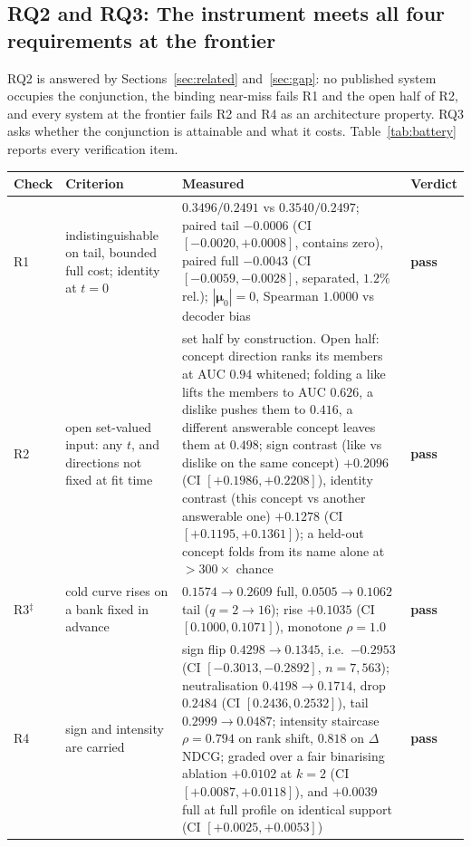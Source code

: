 \documentclass[manuscript,screen]{acmart}
\newcommand{\bmu}{\boldsymbol{\mu}}
\begin{document}
\subsection{RQ2 and RQ3: The instrument meets all four requirements at the frontier}\label{sec:res:battery}

RQ2 is answered by Sections~\ref{sec:related} and~\ref{sec:gap}: no published system occupies the conjunction, the binding near-miss fails R1 and the open half of R2, and every system at the frontier fails R2 and R4 as an architecture property. RQ3 asks whether the conjunction is attainable and what it costs. Table~\ref{tab:battery} reports every verification item.

\begin{table}[t]\centering\small
\setlength{\tabcolsep}{4pt}
\renewcommand{\arraystretch}{1.15}
\begin{tabular}{p{1.7cm}p{3.7cm}p{6.0cm}p{1.2cm}}
\toprule
Check & Criterion & Measured & Verdict \\
\midrule
R1 & indistinguishable on tail, bounded full cost; identity at $t{=}0$ & $0.3496/0.2491$ vs $0.3540/0.2497$; paired tail $-0.0006$ (CI $[-0.0020,+0.0008]$, contains zero), paired full $-0.0043$ (CI $[-0.0059,-0.0028]$, separated, $1.2\%$ rel.); $|\bmu_0|{=}0$, Spearman $1.0000$ vs decoder bias & \textbf{pass} \\
R2 & open set-valued input: any $t$, and directions not fixed at fit time & set half by construction. Open half: concept direction ranks its members at AUC $0.94$ whitened; folding a like lifts the members to AUC $0.626$, a dislike pushes them to $0.416$, a different answerable concept leaves them at $0.498$; sign contrast (like vs dislike on the same concept) $+0.2096$ (CI $[+0.1986,+0.2208]$), identity contrast (this concept vs another answerable one) $+0.1278$ (CI $[+0.1195,+0.1361]$); a held-out concept folds from its name alone at $>300\times$ chance & \textbf{pass} \\
R3$^\ddagger$ & cold curve rises on a bank fixed in advance & $0.1574\!\to\!0.2609$ full, $0.0505\!\to\!0.1062$ tail ($q{=}2\!\to\!16$); rise $+0.1035$ (CI $[0.1000,0.1071]$), monotone $\rho{=}1.0$ & \textbf{pass} \\
R4 & sign and intensity are carried & sign flip $0.4298\!\to\!0.1345$, i.e.\ $-0.2953$ (CI $[-0.3013,-0.2892]$, $n{=}7{,}563$); neutralisation $0.4198\!\to\!0.1714$, drop $0.2484$ (CI $[0.2436,0.2532]$), tail $0.2999\!\to\!0.0487$; intensity staircase $\rho{=}0.794$ on rank shift, $0.818$ on $\Delta$NDCG; graded over a fair binarising ablation $+0.0102$ at $k{=}2$ (CI $[+0.0087,+0.0118]$), and $+0.0039$ full at full profile on identical support (CI $[+0.0025,+0.0053]$) & \textbf{pass} \\

\end{tabular}
\end{table}
\end{document}
